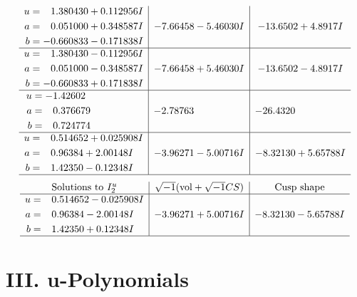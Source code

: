 \documentclass[1p]{elsarticle_modified}
\theoremstyle{definition}
\newcommand{\I}{\sqrt{-1}}
\begin{document}
$$\begin{array}{c|c|c}
\begin{aligned}
u &= \phantom{-}1.380430 + 0.112956 I \\
a &= \phantom{-}0.051000 + 0.348587 I \\
b &= -0.660833 - 0.171838 I\end{aligned}
 & -7.66458 - 5.46030 I & -13.6502 + 4.8917 I \\ \hline\begin{aligned}
u &= \phantom{-}1.380430 - 0.112956 I \\
a &= \phantom{-}0.051000 - 0.348587 I \\
b &= -0.660833 + 0.171838 I\end{aligned}
 & -7.66458 + 5.46030 I & -13.6502 - 4.8917 I \\ \hline\begin{aligned}
u &= -1.42602\phantom{ +0.000000I} \\
a &= \phantom{-}0.376679\phantom{ +0.000000I} \\
b &= \phantom{-}0.724774\phantom{ +0.000000I}\end{aligned}
 & -2.78763\phantom{ +0.000000I} & -26.4320\phantom{ +0.000000I} \\ \hline\begin{aligned}
u &= \phantom{-}0.514652 + 0.025908 I \\
a &= \phantom{-}0.96384 + 2.00148 I \\
b &= \phantom{-}1.42350 - 0.12348 I\end{aligned}
 & -3.96271 - 5.00716 I & -8.32130 + 5.65788 I\\
 \hline 
 \end{array}$$\newpage$$\begin{array}{c|c|c}  
\text{Solutions to }I^u_{2}& \I (\text{vol} + \sqrt{-1}CS) & \text{Cusp shape}\\
 \hline 
\begin{aligned}
u &= \phantom{-}0.514652 - 0.025908 I \\
a &= \phantom{-}0.96384 - 2.00148 I \\
b &= \phantom{-}1.42350 + 0.12348 I\end{aligned}
 & -3.96271 + 5.00716 I & -8.32130 - 5.65788 I\\
 \hline 
 \end{array}$$\newpage
\newpage\renewcommand{\arraystretch}{1}
\centering \section*{ III. u-Polynomials}
\end{document}
